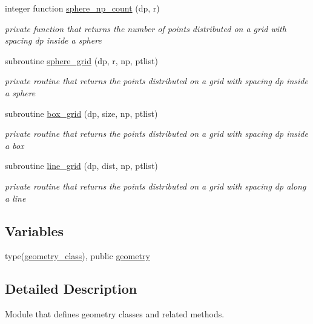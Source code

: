 \begin{DoxyCompactItemize}
integer function \mbox{\hyperlink{namespacegeometry__mod_a05de7940b4e7df5a2b31f3d0414e3743}{sphere\+\_\+np\+\_\+count}} (dp, r)
\begin{DoxyCompactList}\small\item\em private function that returns the number of points distributed on a grid with spacing dp inside a sphere \end{DoxyCompactList}\item 
subroutine \mbox{\hyperlink{namespacegeometry__mod_a6c03a4ea3de6763940396dbeb3908ebc}{sphere\+\_\+grid}} (dp, r, np, ptlist)
\begin{DoxyCompactList}\small\item\em private routine that returns the points distributed on a grid with spacing dp inside a sphere \end{DoxyCompactList}\item 
subroutine \mbox{\hyperlink{namespacegeometry__mod_ae87e4ecff2d21a839da2b82919b5fd0b}{box\+\_\+grid}} (dp, size, np, ptlist)
\begin{DoxyCompactList}\small\item\em private routine that returns the points distributed on a grid with spacing dp inside a box \end{DoxyCompactList}\item 
subroutine \mbox{\hyperlink{namespacegeometry__mod_abcb09c0f5274c27cb79b0dd009ed94b3}{line\+\_\+grid}} (dp, dist, np, ptlist)
\begin{DoxyCompactList}\small\item\em private routine that returns the points distributed on a grid with spacing dp along a line \end{DoxyCompactList}\end{DoxyCompactItemize}
\subsection*{Variables}
\begin{DoxyCompactItemize}
\item 
type(\mbox{\hyperlink{structgeometry__mod_1_1geometry__class}{geometry\+\_\+class}}), public \mbox{\hyperlink{namespacegeometry__mod_ad2ad4f7e1138beaad5f37d5c15b7b457}{geometry}}
\end{DoxyCompactItemize}


\subsection{Detailed Description}
Module that defines geometry classes and related methods. 

